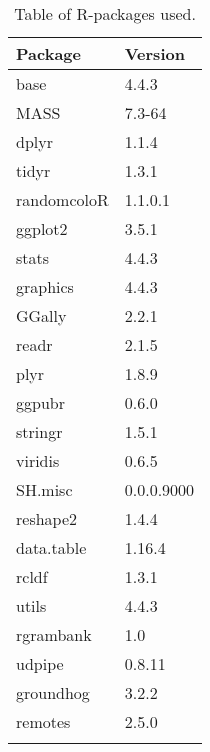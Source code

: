 \begin{longtable}{p{2.5cm}p{2.5cm}}
  \toprule
Package & Version \\ 
  \midrule
base & 4.4.3 \\ 
  MASS & 7.3-64 \\ 
  dplyr & 1.1.4 \\ 
  tidyr & 1.3.1 \\ 
  randomcoloR & 1.1.0.1 \\ 
  ggplot2 & 3.5.1 \\ 
  stats & 4.4.3 \\ 
  graphics & 4.4.3 \\ 
  GGally & 2.2.1 \\ 
  readr & 2.1.5 \\ 
  plyr & 1.8.9 \\ 
  ggpubr & 0.6.0 \\ 
  stringr & 1.5.1 \\ 
  viridis & 0.6.5 \\ 
  SH.misc & 0.0.0.9000 \\ 
  reshape2 & 1.4.4 \\ 
  data.table & 1.16.4 \\ 
  rcldf & 1.3.1 \\ 
  utils & 4.4.3 \\ 
  rgrambank & 1.0 \\ 
  udpipe & 0.8.11 \\ 
  groundhog & 3.2.2 \\ 
  remotes & 2.5.0 \\ 
   \bottomrule
\caption{Table of R-packages used.} 
\label{r_package_table}
\end{longtable}
